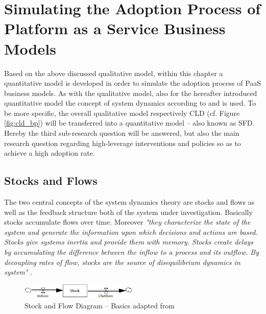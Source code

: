 \chapter{Simulating the Adoption Process of Platform as a Service Business Models}\label{ch:sfd}

Based on the above discussed qualitative model, within this chapter a quantitative model is developed in order to simulate the adoption process of \ac{PaaS} business models. As with the qualitative model, also for the hereafter introduced quantitative model the concept of system dynamics according to \citet{Sterman2000} and \citet{Sterman2001} is used. To be more specific, the overall qualitative model respectively \ac{CLD} (cf. Figure \ref{fig:cld_bp}) will be transferred into a quantitative model -- also known as \acf{SFD}. Hereby the third sub-research question will be answered, but also the main research question regarding high-leverage interventions and policies so as to achieve a high adoption rate.

\section{Stocks and Flows}\label{ch:sfd:sf}

The two central concepts of the system dynamics theory are stocks and flows as well as the feedback structure both of the system under investigation. Basically stocks accumulate flows over time. Moreover \textit{"they characterize the state of the system and generate the information upon which decisions and actions are based. Stocks give systems inertia and provide them with memory. Stocks create delays by accumulating the difference between the inflow to a process and its outflow. By decoupling rates of flow, stocks are the source of disequilibrium dynamics in system"} \citep[p. 192]{Sterman2000}.

\begin{figure}[tb]
	\centering
	\includegraphics[width=0.5\textwidth]{gfx/sfd_basic}
	\caption[Stock and Flow Diagram -- Basics]{Stock and Flow Diagram -- Basics adapted from \citet[p. 194]{Sterman2000}}
	\label{fig:sfd_b}
\end{figure}

